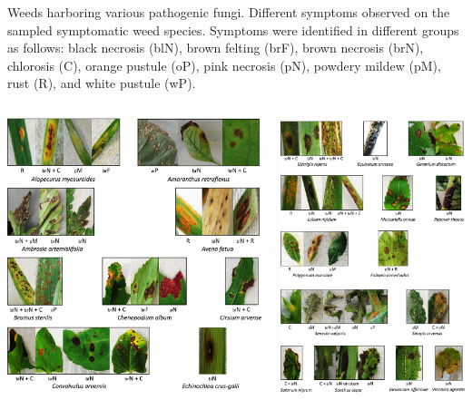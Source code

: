 \documentclass[11pt,dvipsnames,ignorenonframetext,aspectratio=169]{beamer}
\begin{document}
\begin{frame}{}
\protect\hypertarget{section-4}{}
\footnotesize

Weeds harboring various pathogenic fungi. Different symptoms observed on
the sampled symptomatic weed species. Symptoms were identified in
different groups as follows: black necrosis (blN), brown felting (brF),
brown necrosis (brN), chlorosis (C), orange pustule (oP), pink necrosis
(pN), powdery mildew (pM), rust (R), and white pustule (wP).

\begin{columns}

\begin{center}\includegraphics[width=0.54\linewidth]{../images/host-species1} \end{center}


\begin{center}\includegraphics[width=0.54\linewidth]{../images/host-species2} \end{center}

\end{columns}
\end{frame}
\end{document}
